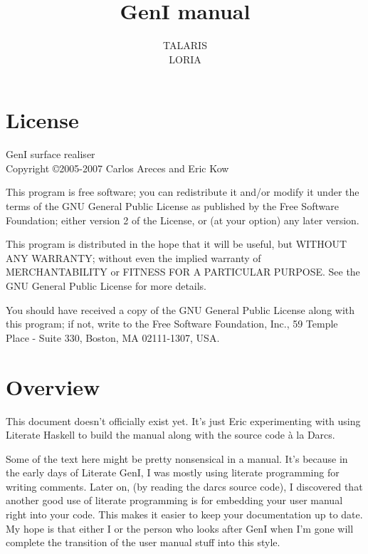 \documentclass[a4paper,11pt]{report}
\begin{document}
\title{GenI manual}
\author{TALARIS\\LORIA}

\maketitle
\tableofcontents


\chapter*{License}

GenI surface realiser\\
Copyright \copyright 2005-2007 Carlos Areces and Eric Kow

\bigskip

This program is free software; you can redistribute it and/or
modify it under the terms of the GNU General Public License
as published by the Free Software Foundation; either version 2
of the License, or (at your option) any later version.

\bigskip

This program is distributed in the hope that it will be useful,
but WITHOUT ANY WARRANTY; without even the implied warranty of
MERCHANTABILITY or FITNESS FOR A PARTICULAR PURPOSE.  See the
GNU General Public License for more details.

\bigskip

You should have received a copy of the GNU General Public License
along with this program; if not, write to the Free Software
Foundation, Inc., 59 Temple Place - Suite 330, Boston, MA  02111-1307, USA.

\chapter{Overview}

This document doesn't officially exist yet.  It's just Eric
experimenting with using Literate Haskell to build the manual
along with the source code \`a la Darcs.

Some of the text here might be pretty nonsensical in a manual.  It's
because in the early days of Literate GenI, I was mostly using literate
programming for writing comments.  Later on, (by reading the darcs
source code),  I discovered that another good use of literate
programming is for embedding your user manual right into your code.
This makes it easier to keep your documentation up to date.  My hope
is that either I or the person who looks after GenI when I'm gone
will complete the transition of the user manual stuff into this style.
\end{document}
